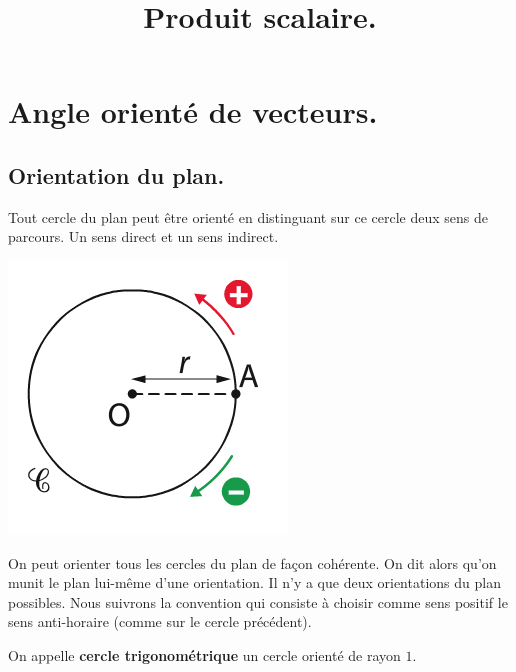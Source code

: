 \documentclass[a4paper,11pt]{article}
\title{Produit scalaire.}
\author{}
\date{}
\theoremstyle{break}
\begin{document}
 
  \maketitle


  
  \section{Angle orienté de vecteurs.}
  
  \subsection{Orientation du plan.}
  
  \begin{proposition}
   Tout cercle du plan peut être orienté en distinguant sur ce cercle deux sens de parcours. Un sens direct
   et un sens indirect.
 
 \begin{center}
   \includegraphics[scale=0.5]{../Images/orientation.png}
 \end{center}

  
   
    On peut orienter tous les cercles du plan de façon cohérente. On dit alors qu'on munit le plan lui-même
    d'une orientation. Il n'y a que deux orientations du plan possibles. Nous suivrons la convention
    qui consiste à choisir comme sens positif le sens anti-horaire (comme sur le cercle précédent).
    
    On appelle  \textbf{cercle trigonométrique} un cercle orienté de rayon $1$. 
    
  \end{proposition}
\end{document}
